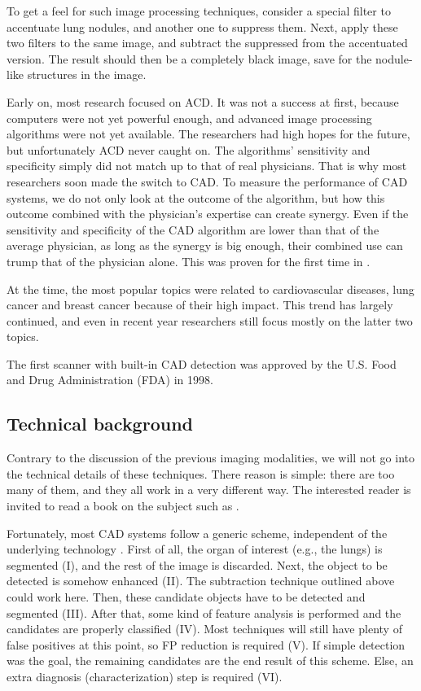 To get a feel for such image processing techniques, consider a special filter
to accentuate lung nodules, and another one to suppress them. Next, apply these
two filters to the same image, and subtract the suppressed from the accentuated
version. The result should then be a completely black image, save for the
nodule-like structures in the image. 

Early on, most research focused on ACD. It was not a success at first,
because computers were not yet powerful enough, and advanced image processing
algorithms were not yet available. The researchers had high hopes for the
future, but unfortunately ACD never caught on. The algorithms' sensitivity and
specificity simply did not match up to that of real physicians. That is why most
researchers soon made the switch to CAD. To measure the performance of CAD
systems, we do not only look at the outcome of the algorithm, but how this outcome
combined with the physician's expertise can create synergy. Even if the
sensitivity and specificity of the CAD algorithm are lower than that of the
average physician, as long as the synergy is big enough, their combined use can
trump that of the physician alone. This was proven for the first time in
\cite{cadsynergy}.

At the time, the most popular topics were related to cardiovascular diseases,
lung cancer and breast cancer because of their high impact. This trend has
largely continued, and even in recent year researchers still focus mostly on the
latter two topics. \cite{cadhistory}

The first scanner with built-in CAD detection was approved by the U.S. Food and
Drug Administration (FDA) in 1998.

\subsection{Technical background}\label{ssec:cadtech}
Contrary to the discussion of the previous imaging modalities, we will not go
into the technical details of these techniques. There reason is simple: there
are too many of them, and they all work in a very different way. The interested
reader is invited to read a book on the subject such as \cite{imgprocbook}.

Fortunately, most CAD systems follow a generic scheme, independent of the
underlying technology \cite{lungcadreview}. First of all, the organ of interest
(e.g., the lungs) is segmented (I), and the rest of the image is discarded.
Next, the object to be detected is somehow enhanced (II). The subtraction
technique outlined above could work here. Then, these candidate objects have to
be detected and segmented (III). After that, some kind of feature analysis is
performed and the candidates are properly classified (IV). Most techniques will
still have plenty of false positives at this point, so FP reduction is required
(V). If simple detection was the goal, the remaining candidates are the end
result of this scheme. Else, an extra diagnosis (characterization) step is
required (VI).

